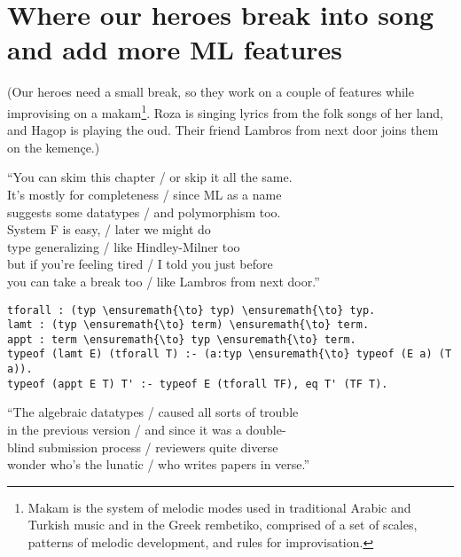 \section{Where our heroes break into song and add more ML
features}\label{where-our-heroes-break-into-song-and-add-more-ml-features}

\begin{scenecomment}
(Our heroes need a small break, so they work on a couple of features while improvising on a makam\footnote{Makam is the system of melodic modes used in traditional Arabic and Turkish music and in the Greek rembetiko, comprised of a set of scales, patterns of melodic development, and rules for improvisation.}. Roza is singing lyrics from the folk songs of her land, and Hagop is playing the oud. Their friend Lambros from next door joins them on the kemen\c{c}e.)
\end{scenecomment}

\begin{versy}
``You can skim this chapter / or skip it all the same. \\
It's mostly for completeness / since ML as a name \\
suggests some datatypes / and polymorphism too. \\

System F is easy, / later we might do \\
type generalizing / like Hindley-Milner too \\
but if you're feeling tired / I told you just before \\
you can take a break too / like Lambros from next door.''
\end{versy}

\begin{verbatim}
tforall : (typ \ensuremath{\to} typ) \ensuremath{\to} typ.
lamt : (typ \ensuremath{\to} term) \ensuremath{\to} term.
appt : term \ensuremath{\to} typ \ensuremath{\to} term.
typeof (lamt E) (tforall T) :- (a:typ \ensuremath{\to} typeof (E a) (T a)).
typeof (appt E T) T' :- typeof E (tforall TF), eq T' (TF T).
\end{verbatim}

\begin{versy}
``The algebraic datatypes / caused all sorts of trouble \\
in the previous version / and since it was a double- \\
blind submission process / reviewers quite diverse \\
wonder who's the lunatic / who writes papers in verse.''
\end{versy}

